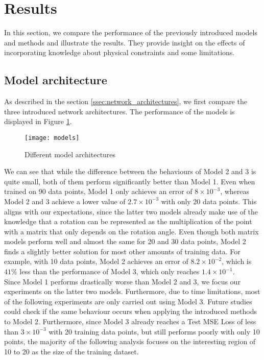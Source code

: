 \label{section:results}
\section{Results}

In this section, we compare the performance of the previously introduced models and methods and illustrate the results. They provide insight on the effects of incorporating knowledge about physical constraints and some limitations.

\subsection{Model architecture}
As described in the section \ref{ssec:network_architectures}, we first compare the three introduced network architectures. The performance of the models is displayed in Figure \ref{fig:models}.
\begin{figure}[H]
	\texttt{[image: models]}
	\caption{Different model architectures}
	\label{fig:models}
\end{figure}
We can see that while the difference between the behaviours of Model 2 and 3 is quite small, both of them perform significantly better than Model 1. Even when trained on 90 data points, Model 1 only achieves an error of $8\times 10^{-3}$, whereas Model 2 and 3 achieve a lower value of $2.7\times 10^{-3}$ with only 20 data points. This aligns with our expectations, since the latter two models already make use of the knowledge that a rotation can be represented as the multiplication of the point with a matrix that only depends on the rotation angle. Even though both matrix models perform well and almost the same for 20 and 30 data points, Model 2 finds a slightly better solution for most other amounts of training data. For example, with 10 data points, Model 2 achieves an error of $8.2\times 10^{-2}$, which is $41\%$ less than the performance of Model 3, which only reaches $1.4\times 10^{-1}$.\\
\indent Since Model 1 performs drastically worse than Model 2 and 3, we focus our experiments on the latter two models. Furthermore, due to time limitations, most of the following experiments are only carried out using Model 3. Future studies could check if the same behaviour occurs when applying the introduced methods to Model 2. Furthermore, since Model 3 already reaches a Test MSE Loss of less than $3\times10^{-3}$ with 20 training data points, but still performs poorly with only 10 points, the majority of the following analysis focuses on the interesting region of 10 to 20 as the size of the training dataset. \\
